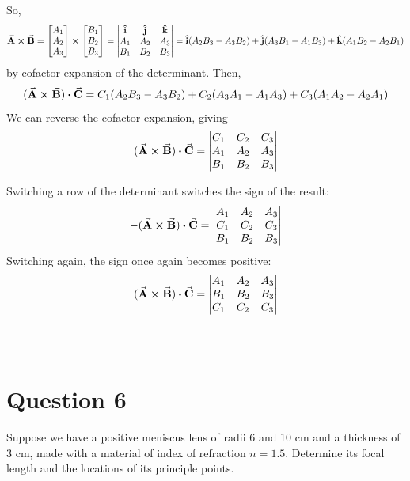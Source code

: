 \documentclass[a4paper]{article}
\begin{document}
So,
$$ \va{A} \cross \va{B} = \begin{bmatrix}
    A_1 \\
    A_2 \\
    A_3 \\
\end{bmatrix} \cross
\begin{bmatrix}
    B_1 \\
    B_2 \\
    B_3 \\
\end{bmatrix} = \begin{vmatrix}
    \vu{i} & \vu{j} & \vu{k} \\
    A_1 & A_2 & A_3 \\
    B_1 & B_2 & B_3 \\
    \end{vmatrix} = \vu{i}(A_2 B_3 - A_3 B_2) + \vu{j}(A_3 B_1 - A_1 B_3) + \vu{k}(A_1 B_2 - A_2 B_1) $$
by cofactor expansion of the determinant.
Then, 
$$(\va{A} \cross \va{B}) \vdot \va{C} = C_1 (A_2 B_3 - A_3 B_2) + C_2 (A_3 A_1 - A_1 A_3) + C_3 (A_1 A_2 - A_2 A_1)$$
We can reverse the cofactor expansion, giving
$$ (\va{A} \cross \va{B}) \vdot \va{C} = 
    \begin{vmatrix}
    C_1 & C_2 & C_3 \\
    A_1 & A_2 & A_3 \\
    B_1 & B_2 & B_3 \\
    \end{vmatrix}$$

Switching a row of the determinant switches the sign of the result:
$$ -(\va{A} \cross \va{B}) \vdot \va{C} = 
    \begin{vmatrix}
    A_1 & A_2 & A_3 \\
    C_1 & C_2 & C_3 \\
    B_1 & B_2 & B_3 \\
    \end{vmatrix}$$
Switching again, the sign once again becomes positive:
$$ (\va{A} \cross \va{B}) \vdot \va{C} = 
    \begin{vmatrix}
    A_1 & A_2 & A_3 \\
    B_1 & B_2 & B_3 \\
    C_1 & C_2 & C_3 
    \end{vmatrix}  $$ \\\\


\section*{Question 6}
Suppose we have a positive meniscus lens of radii 6 and 10 cm and a thickness of 3 cm, made with
a material of index of refraction $n = 1.5$. Determine its focal length and the locations of its principle
points.\\\\
\end{document}

